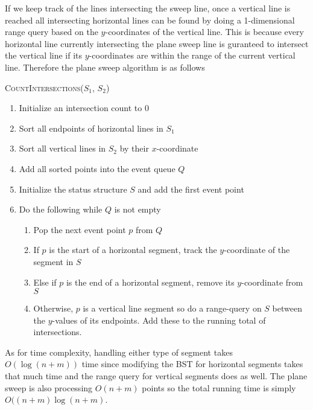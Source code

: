 \documentclass[12pt]{extarticle}
\begin{document}
\begin{solution}
    If we keep track of the lines intersecting the sweep line, once a vertical line is reached all intersecting horizontal lines can be found by doing a 1-dimensional range query based on the $y$-coordinates of the vertical line. This is because every horizontal line currently intersecting the plane sweep line is guranteed to intersect the vertical line if its $y$-coordinates are within the range of the current vertical line. Therefore the plane sweep algorithm is as follows
    \begin{algorithm}[H]
        \caption{\textsc{CountIntersections}($S_1$, $S_2$)}
        \begin{enumerate}
            \item Initialize an intersection count to 0
            \item Sort all endpoints of horizontal lines in $S_1$
            \item Sort all vertical lines in $S_2$ by their $x$-coordinate
            \item Add all sorted points into the event queue $Q$
            \item Initialize the status structure $S$ and add the first event point 
            \item Do the following while $Q$ is not empty
                \begin{enumerate}
                    \item Pop the next event point $p$ from $Q$
                    \item If $p$ is the start of a horizontal segment, track the $y$-coordinate of the segment in $S$
                    \item Else if $p$ is the end of a horizontal segment, remove its $y$-coordinate from $S$
                    \item Otherwise, $p$ is a vertical line segment so do a range-query on $S$ between the $y$-values of its endpoints. Add these to the running total of intersections.
                \end{enumerate}
        \end{enumerate}
    \end{algorithm}

    As for time complexity, handling either type of segment takes $O(\log(n + m))$ time since modifying the BST for horizontal segments takes that much time and the range query for vertical segments does as well. The plane sweep is also processing $O(n + m)$ points so the total running time is simply $O((n + m) \log (n + m)$.
\end{solution}
\end{document}
